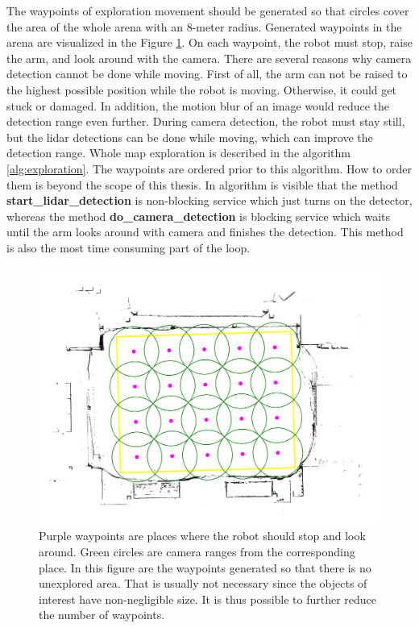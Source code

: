 The waypoints of exploration movement should be generated so that circles cover the area of the whole arena with an 8-meter radius. Generated waypoints in the arena are visualized in the Figure \ref{fig:map_annot}. On each waypoint, the robot must stop, raise the arm, and look around with the camera. There are several reasons why camera detection cannot be done while moving. First of all, the arm can not be raised to the highest possible position while the robot is moving. Otherwise, it could get stuck or damaged. In addition, the motion blur of an image would reduce the detection range even further. During camera detection, the robot must stay still, but the lidar detections can be done while moving, which can improve the detection range. Whole map exploration is described in the algorithm \ref{alg:exploration}. The waypoints are ordered prior to this algorithm. How to order them is beyond the scope of this thesis. In algorithm is visible that the method \textbf{start\_lidar\_detection} is non-blocking service which just turns on the detector, whereas the method \textbf{do\_camera\_detection} is blocking service which waits until the arm looks around with camera and finishes the detection. This method is also the most time consuming part of the loop.

\begin{figure}[H]
	\centering
	\includegraphics[scale=0.25]{fig/map_annotation.png}
	\caption[Generated waypoints]{Purple waypoints are places where the robot should stop and look around. Green circles are camera ranges from the corresponding place. In this figure are the waypoints generated so that there is no unexplored area. That is usually not necessary since the objects of interest have non-negligible size. It is thus possible to further reduce the number of waypoints.}
	\label{fig:map_annot}
\end{figure}

